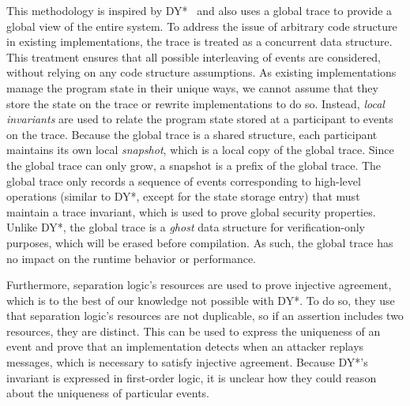 This methodology is inspired by DY*~\cite{bhargavan2021text} and also uses a global trace to provide a global view of the entire system.
To address the issue of arbitrary code structure in existing implementations, the trace is treated as a concurrent data structure.
This treatment ensures that all possible interleaving of events are considered, without relying on any code structure assumptions.
As existing implementations manage the program state in their unique ways, we cannot assume that they store the state on the trace or rewrite implementations to do so. Instead, \emph{local invariants} are used to relate the program state stored at a participant to events on the trace.
Because the global trace is a shared structure, each participant maintains its own local \emph{snapshot}, which is a local copy of the global trace. Since the global trace can only grow, a snapshot is a prefix of the global trace. 
The global trace only records a sequence of events corresponding to high-level operations (similar to DY*, except for the state storage entry) that must maintain a trace invariant, which is used to prove global security properties.
Unlike DY*, the global trace is a \emph{ghost} data structure for verification-only purposes, which will be erased before compilation. As such, the global trace has no impact on the runtime behavior or performance.

Furthermore, separation logic's resources are used to prove injective agreement, which is to the best of our knowledge not possible with DY*.
To do so, they use that separation logic's resources are not duplicable, so if an assertion includes two resources, they are distinct.
This can be used to express the uniqueness of an event and prove that an implementation detects when an attacker replays messages, which is necessary to satisfy injective agreement.
Because DY*'s invariant is expressed in first-order logic, it is unclear how they could reason about the uniqueness of particular events.

